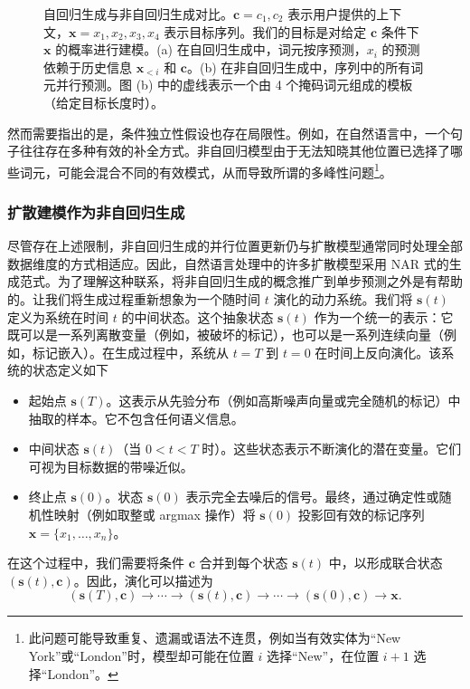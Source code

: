\documentclass[UTF8,a4paper,zihao=-4,oneside,openany]{ctexbook}
\makeatletter
\newcommand{\AMLFigure}[2][0.96\linewidth]{%
  \begingroup
  \let\AtBeginDocument\@gobble
  \endgroup
}
\makeatother
\begin{document}
\begin{figure}[!t]
\centering
\AMLFigure{figure-ar-vs-nar-generation}
\caption{自回归生成与非自回归生成对比。$\mathbf{c} = {c_1,c_2}$ 表示用户提供的上下文，$\mathbf{x}={x_1,x_2,x_3,x_4}$ 表示目标序列。我们的目标是对给定 $\mathbf{c}$ 条件下 $\mathbf{x}$ 的概率进行建模。(a) 在自回归生成中，词元按序预测，$x_i$ 的预测依赖于历史信息 $\mathbf{x}_{<i}$ 和 $\mathbf{c}$。(b) 在非自回归生成中，序列中的所有词元并行预测。图 (b) 中的虚线表示一个由 4 个掩码词元组成的模板（给定目标长度时）。}
\label{fig:ar-vs-nar-generation}
\end{figure}

然而需要指出的是，条件独立性假设也存在局限性。例如，在自然语言中，一个句子往往存在多种有效的补全方式。非自回归模型由于无法知晓其他位置已选择了哪些词元，可能会混合不同的有效模式，从而导致所谓的多峰性问题\footnote{此问题可能导致重复、遗漏或语法不连贯，例如当有效实体为“New York”或“London”时，模型却可能在位置 $i$ 选择“New”，在位置 $i+1$ 选择“London”。}。

\subsubsection{扩散建模作为非自回归生成}

尽管存在上述限制，非自回归生成的并行位置更新仍与扩散模型通常同时处理全部数据维度的方式相适应。因此，自然语言处理中的许多扩散模型采用 NAR 式的生成范式。为了理解这种联系，将非自回归生成的概念推广到单步预测之外是有帮助的。让我们将生成过程重新想象为一个随时间 $t$ 演化的动力系统。我们将 $\mathbf{s}(t)$ 定义为系统在时间 $t$ 的中间状态。这个抽象状态 $\mathbf{s}(t)$ 作为一个统一的表示：它既可以是一系列离散变量（例如，被破坏的标记），也可以是一系列连续向量（例如，标记嵌入）。在生成过程中，系统从 $t=T$ 到 $t=0$ 在时间上反向演化。该系统的状态定义如下

\begin{itemize}
\item 起始点 $\mathbf{s}(T)$。这表示从先验分布（例如高斯噪声向量或完全随机的标记）中抽取的样本。它不包含任何语义信息。
\item 中间状态 $\mathbf{s}(t)$（当 $0 < t < T$ 时）。这些状态表示不断演化的潜在变量。它们可视为目标数据的带噪近似。
\item 终止点 $\mathbf{s}(0)$。状态 $\mathbf{s}(0)$ 表示完全去噪后的信号。最终，通过确定性或随机性映射（例如取整或 argmax 操作）将 $\mathbf{s}(0)$ 投影回有效的标记序列 $\mathbf{x} = \{x_1, \dots, x_n\}$。
\end{itemize}

在这个过程中，我们需要将条件 $\mathbf{c}$ 合并到每个状态 $\mathbf{s}(t)$ 中，以形成联合状态 $(\mathbf{s}(t), \mathbf{c})$。因此，演化可以描述为
\begin{equation}
(\mathbf{s}(T), \mathbf{c}) \to \cdots \to (\mathbf{s}(t), \mathbf{c}) \to \cdots \to (\mathbf{s}(0), \mathbf{c}) \to \mathbf{x}.
\end{equation}
\end{document}
